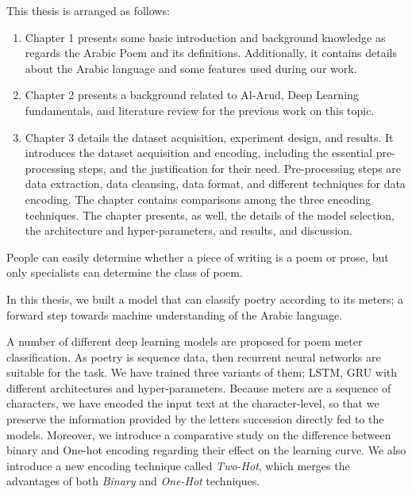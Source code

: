 \begin{spacing}{1}\end{spacing}
This thesis is arranged as follows:
\begin{enumerate}
  \item Chapter 1 presents some basic introduction and background knowledge as regards the Arabic Poem and its definitions. Additionally, it contains details about the Arabic language and some features used during our work.
  \item Chapter 2 presents a background related to Al-Arud, Deep Learning fundamentals, and
  literature review for the previous work on this topic.
  \item Chapter 3 details the dataset acquisition, experiment design, and results. It introduces the
  dataset acquisition and encoding, including the essential pre-processing steps, and the
  justification for their need. Pre-processing steps are data extraction, data cleansing, data
  format, and different techniques for data encoding. The chapter contains comparisons among the
  three encoding techniques. The chapter presents, as well, the details of the model selection, the
  architecture and hyper-parameters, and results, and discussion.
\end{enumerate}


\begin{spacing}{1}\end{spacing}

People can easily determine whether a piece of writing is a poem or prose, but only specialists can determine the class of poem.

In this thesis, we built a model that can classify poetry according to its meters; a forward step towards machine understanding of the Arabic language.

A number of different deep learning models are proposed for poem meter classification. As poetry is sequence data, then recurrent neural networks are suitable for the task. We have trained three variants of them; LSTM, GRU with different architectures and hyper-parameters. Because meters are a sequence of characters, we have encoded the input text at the character-level, so that we preserve the information provided by the letters succession directly fed to the models. Moreover, we introduce a comparative study on the difference between binary and One-hot encoding regarding their effect on the learning curve. We also introduce a new encoding technique called \textit{Two-Hot}, which merges the advantages of both \textit{Binary} and \textit{One-Hot} techniques.


